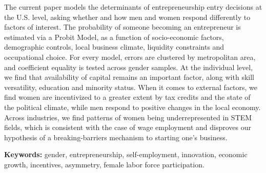 \singlespacing 

The current paper models the determinants of entrepreneurship entry decisions at the U.S. level, asking whether and how men and women respond differently to factors of interest. The probability of someone becoming an entrepreneur is estimated via a Probit Model, as a function of socio-economic factors, demographic controls, local business climate, liquidity constraints and occupational choice. For every model, errors are clustered by metropolitan area, and coefficient equality is tested across gender samples. At the individual level, we find that availability of capital remains an important factor, along with skill versatility, education and minority status. When it comes to external factors, we find women are incentivized to a greater extent by tax credits and the state of the political climate, while men respond to positive changes in the local economy. Across industries, we find patterns of women being underrepresented in STEM fields, which is consistent with the case of wage employment and disproves our hypothesis of a breaking-barriers mechanism to starting one's business. 

\singlespacing \textbf{Keywords:} gender, entrepreneurship, self-employment, innovation, economic growth, incentives, asymmetry, female labor force participation.

\bodyspacing